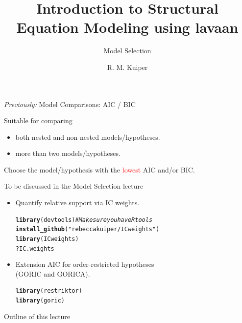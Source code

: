 \documentclass[10pt]{beamer}\usepackage[]{graphicx}\usepackage[]{xcolor}
\title{Introduction to Structural Equation Modeling using lavaan}
\subtitle{Model Selection}
\author{R. M. Kuiper}
\institute{Department of Methodology \& Statistics \\ Utrecht University}
\date{}
\makeatletter
\newcommand{\hlstr}[1]{\textcolor[rgb]{0.192,0.494,0.8}{#1}}%
\newcommand{\hlcom}[1]{\textcolor[rgb]{0.678,0.584,0.686}{\textit{#1}}}%
\newcommand{\hlopt}[1]{\textcolor[rgb]{0,0,0}{#1}}%
\newcommand{\hlstd}[1]{\textcolor[rgb]{0.345,0.345,0.345}{#1}}%
\newcommand{\hlkwd}[1]{\textcolor[rgb]{0.737,0.353,0.396}{\textbf{#1}}}%
\newenvironment{kframe}{%
 \def\at@end@of@kframe{}%
 \ifinner\ifhmode%
  \def\at@end@of@kframe{\end{minipage}}%
  \begin{minipage}{\columnwidth}%
 \fi\fi%
 \def\FrameCommand##1{\hskip\@totalleftmargin \hskip-\fboxsep
 \colorbox{shadecolor}{##1}\hskip-\fboxsep
     \hskip-\linewidth \hskip-\@totalleftmargin \hskip\columnwidth}%
 \MakeFramed {\advance\hsize-\width
   \@totalleftmargin\z@ \linewidth\hsize
   \@setminipage}}%
 {\par\unskip\endMakeFramed%
 \at@end@of@kframe}
\newenvironment{knitrout}{}{} %
\makeatother
\begin{document}



\begin{frame}[t, plain]
  \titlepage
\end{frame}
%
%
\begin{frame}[fragile]{\textit{Previously:} Model Comparisons: AIC / BIC}

Suitable for comparing
\begin{itemize}
  \item both nested and non-nested models/hypotheses.
  \item more than two models/hypotheses.
\end{itemize}

\vspace*{5mm}

Choose the model/hypothesis with the \textcolor{red}{lowest} AIC and/or BIC.

\vspace*{5mm}

To be discussed in the Model Selection lecture
\begin{itemize}
  \item Quantify relative support via IC weights.\\
\begin{knitrout}
\color{fgcolor}\begin{kframe}
\begin{alltt}
\hlkwd{library}\hlstd{(devtools)} \hlcom{# Make sure you have Rtools}
\hlkwd{install_github}\hlstd{(}\hlstr{"rebeccakuiper/ICweights"}\hlstd{)}
\hlkwd{library}\hlstd{(ICweights)}
\hlopt{?}\hlstd{IC.weights}
\end{alltt}
\end{kframe}
\end{knitrout}
  \item Extension AIC for order-restricted hypotheses \\ (GORIC and GORICA).\\
\begin{knitrout}
\color{fgcolor}\begin{kframe}
\begin{alltt}
\hlkwd{library}\hlstd{(restriktor)}
\hlkwd{library}\hlstd{(goric)}
\end{alltt}
\end{kframe}
\end{knitrout}
\end{itemize}

\end{frame}
%
\begin{frame}{Outline of this lecture}
\tableofcontents[hidesubsections]
\end{frame}
%
\end{document}
